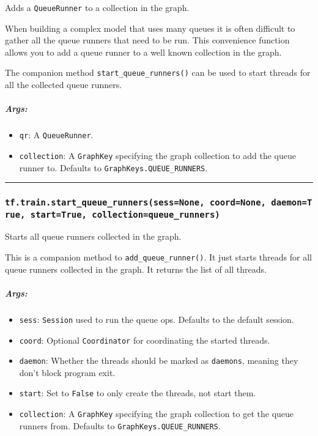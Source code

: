 Adds a \texttt{QueueRunner} to a collection in the graph.

When building a complex model that uses many queues it is often
difficult to gather all the queue runners that need to be run. This
convenience function allows you to add a queue runner to a well known
collection in the graph.

The companion method \texttt{start\_queue\_runners()} can be used to
start threads for all the collected queue runners.

\subparagraph{Args: }\label{args-28}

\begin{itemize}
\tightlist
\item
  \texttt{qr}: A \texttt{QueueRunner}.
\item
  \texttt{collection}: A \texttt{GraphKey} specifying the graph
  collection to add the queue runner to. Defaults to
  \texttt{GraphKeys.QUEUE\_RUNNERS}.
\end{itemize}

\begin{center}\rule{0.5\linewidth}{\linethickness}\end{center}

\subsubsection{\texorpdfstring{\texttt{tf.train.start\_queue\_runners(sess=None,\ coord=None,\ daemon=True,\ start=True,\ collection=\textquotesingle{}queue\_runners\textquotesingle{})}
}{tf.train.start\_queue\_runners(sess=None, coord=None, daemon=True, start=True, collection='queue\_runners') }}\label{tf.train.startux5fqueueux5frunnerssessnone-coordnone-daemontrue-starttrue-collectionqueueux5frunners}

Starts all queue runners collected in the graph.

This is a companion method to \texttt{add\_queue\_runner()}. It just
starts threads for all queue runners collected in the graph. It returns
the list of all threads.

\subparagraph{Args: }\label{args-29}

\begin{itemize}
\tightlist
\item
  \texttt{sess}: \texttt{Session} used to run the queue ops. Defaults to
  the default session.
\item
  \texttt{coord}: Optional \texttt{Coordinator} for coordinating the
  started threads.
\item
  \texttt{daemon}: Whether the threads should be marked as
  \texttt{daemons}, meaning they don't block program exit.
\item
  \texttt{start}: Set to \texttt{False} to only create the threads, not
  start them.
\item
  \texttt{collection}: A \texttt{GraphKey} specifying the graph
  collection to get the queue runners from. Defaults to
  \texttt{GraphKeys.QUEUE\_RUNNERS}.
\end{itemize}

